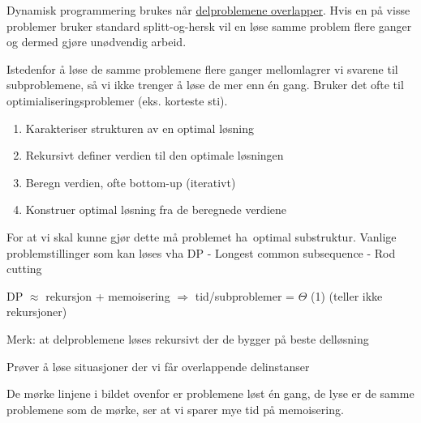 \documentclass[12pt]{report}
\begin{document}

\setlength{\parskip}{0.0pt}
Dynamisk programmering brukes når \uline{delproblemene overlapper}. Hvis en på visse problemer bruker standard splitt-og-hersk vil en løse samme problem flere ganger og dermed gjøre unødvendig arbeid. \par

Istedenfor å løse de samme problemene flere ganger mellomlagrer vi svarene til subproblemene, så vi ikke trenger å løse de mer enn én gang. Bruker det ofte til optimialiseringsproblemer (eks. korteste sti).\par

\begin{enumerate}
	\item Karakteriser strukturen av en optimal løsning\par

	\item Rekursivt definer verdien til den optimale løsningen\par

	\item Beregn verdien, ofte bottom-up (iterativt)\par

	\item Konstruer optimal løsning fra de beregnede verdiene
\end{enumerate}\par

For at vi skal kunne gjør dette må problemet ha optimal substruktur. Vanlige problemstillinger som kan løses vha DP - Longest common subsequence - Rod cutting\par

DP $ \approx $  rekursjon + memoisering $ \Rightarrow $  tid/subproblemer = $ \Theta $ (1) (teller ikke rekursjoner)\par

	\item Merk: at delproblemene løses rekursivt der de bygger på beste delløsning\par

	\item Prøver å løse situasjoner der vi får overlappende delinstanser\par


\vspace{\baselineskip}
De mørke linjene i bildet ovenfor er problemene løst én gang, de lyse er de samme problemene som de mørke, ser at vi sparer mye tid på memoisering.\par
\end{document}
